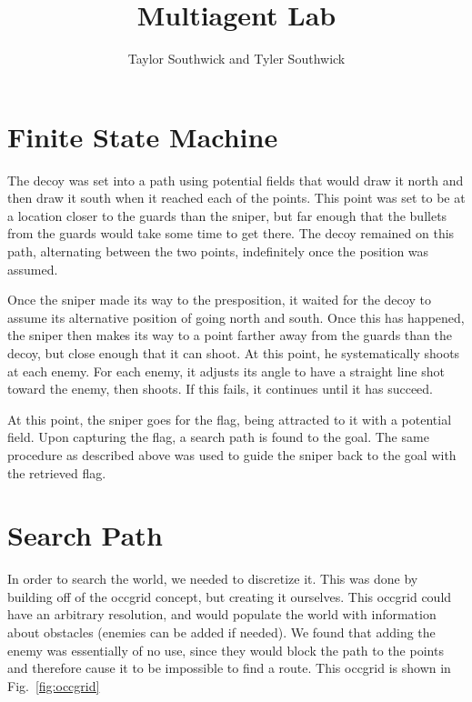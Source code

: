 \documentclass{article}
\author{Taylor Southwick and Tyler Southwick}
\title{Multiagent Lab}
\begin{document}
\maketitle

\section{Finite State Machine}
The decoy was set into a path using potential fields that would draw it north and then draw it south when it reached each of the points.  This point was set to be at a location closer to the guards than the sniper, but far enough that the bullets from the guards would take some time to get there.  The decoy remained on this path, alternating between the two points, indefinitely once the position was assumed.

Once the sniper made its way to the presposition, it waited for the decoy to assume its alternative position of going north and south.  Once this has happened, the sniper then makes its way to a point farther away from the guards than the decoy, but close enough that it can shoot.  At this point, he systematically shoots at each enemy.  For each enemy, it adjusts its angle to have a straight line shot toward the enemy, then shoots.  If this fails, it continues until it has succeed.  

At this point, the sniper goes for the flag, being attracted to it with a potential field.  Upon capturing the flag, a search path is found to the goal.  The same procedure as described above was used to guide the sniper back to the goal with the retrieved flag.


\section{Search Path}
In order to search the world, we needed to discretize it.  This was done by building off of the occgrid concept, but creating it ourselves.  This occgrid could have an arbitrary resolution, and would populate the world with information about obstacles (enemies can be added if needed).  We found that adding the enemy was essentially of no use, since they would block the path to the points and therefore cause it to be impossible to find a route.  This occgrid is shown in Fig.~\ref{fig:occgrid}
\end{document}
